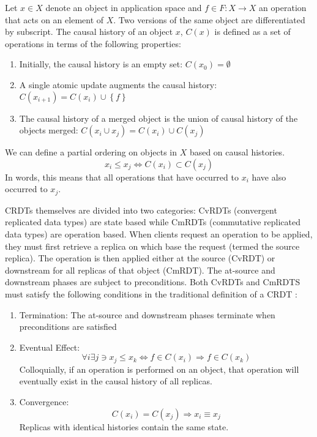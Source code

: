\documentclass[twoside]{article}
\begin{document}
\begin{multicols}{2}
Let $x\in X$ denote an object in application space and
$f \in F:X \rightarrow X$ an operation that acts on an element of
$X$. Two versions of the same object are differentiated by subscript.
The causal history of an object $x$, $C(x)$ is defined as a set of
operations in terms of the following properties:
\begin{enumerate}
  \item Initially, the causal history is an empty set: $C(x_0) = \emptyset$
  \item A single atomic update augments the causal history: $C(x_{i+1}) =
    C(x_i)\cup \left\{f\right\}$
  \item The causal history of a merged object is the union of causal
    history of the objects merged: $C(x_i\cup x_j) = C(x_i)\cup C(x_j)$
\end{enumerate}
We can define a partial ordering on objects in $X$ based on causal
histories.
\[ x_i \leq x_j \Leftrightarrow C\left(x_i\right) \subset C\left(x_j\right) \]
In words, this means that all operations that have occurred to $x_i$
have also occurred to $x_j$.

CRDTs themselves are divided into two categories: CvRDTs (convergent
replicated data types) are state based while CmRDTs (commutative
replicated data types) are operation based. When clients request
an operation to be applied, they must first retrieve a replica on
which base the request (termed the source replica). The operation is
then applied either at the source (CvRDT) or downstream for all
replicas of that object (CmRDT). The at-source and downstream phases
are subject to preconditions. Both CvRDTs and CmRDTS must satisfy
the following conditions in the traditional definition of a CRDT
\cite{shapiro2011convergent}:

\begin{enumerate}
  \item Termination: The at-source and downstream phases terminate
    when preconditions are satisfied
  \item Eventual Effect:
    \[\forall i \exists j \ni x_j \leq x_k \Leftrightarrow f\in C\left(x_i\right) \Rightarrow f\in C\left(x_k\right) \]
    Colloquially, if an operation is performed on an object, that
    operation will eventually exist in the causal history of all replicas.
  \item Convergence:
    \[C\left(x_i\right) = C\left(x_j\right) \Rightarrow x_i \equiv x_j\]
    Replicas with identical histories contain the same state.
\end{enumerate}


\end{multicols}
\end{document}
